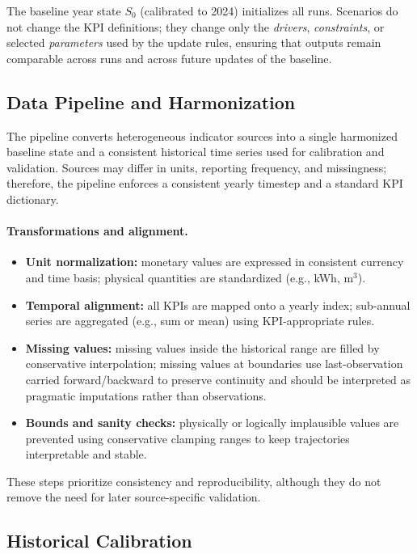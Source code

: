 \documentclass[urbansci,article,submit,pdftex,moreauthors]{Definitions/mdpi}
\begin{document}
The baseline year state $S_0$ (calibrated to 2024) initializes all runs.
Scenarios do not change the KPI definitions; they change only the
\textit{drivers}, \textit{constraints}, or selected \textit{parameters} used
by the update rules, ensuring that outputs remain comparable across runs and
across future updates of the baseline.

\subsection{Data Pipeline and Harmonization}
\label{subsec:data_pipeline}

The pipeline converts heterogeneous indicator sources into a single harmonized
baseline state and a consistent historical time series used for calibration and
validation. Sources may differ in units, reporting frequency, and missingness;
therefore, the pipeline enforces a consistent yearly timestep and a standard
KPI dictionary.

\paragraph{Transformations and alignment.}
\begin{itemize}
\item \textbf{Unit normalization:} monetary values are expressed in consistent
      currency and time basis; physical quantities are standardized
      (e.g., kWh, m$^3$).
\item \textbf{Temporal alignment:} all KPIs are mapped onto a yearly index;
      sub-annual series are aggregated (e.g., sum or mean) using
      KPI-appropriate rules.
\item \textbf{Missing values:} missing values inside the historical range are
      filled by conservative interpolation; missing values at boundaries use
      last-observation carried forward/backward to preserve continuity and
      should be interpreted as pragmatic imputations rather than observations.
\item \textbf{Bounds and sanity checks:} physically or logically implausible
      values are prevented using conservative clamping ranges to keep
      trajectories interpretable and stable.
\end{itemize}

These steps prioritize consistency and reproducibility, although they do not
remove the need for later source-specific validation.

\subsection{Historical Calibration}
\label{sec:calibration}
\end{document}
